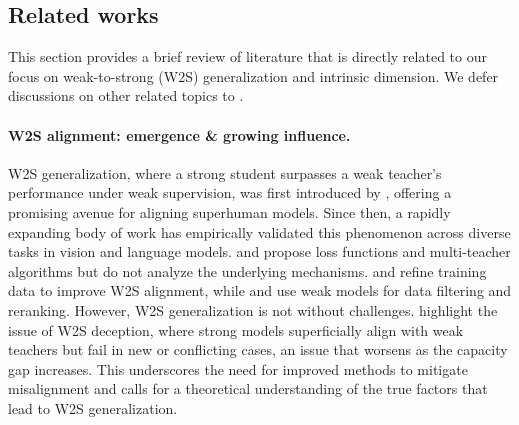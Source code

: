 \subsection{Related works}
This section provides a brief review of literature that is directly related to our focus on weak-to-strong (W2S) generalization and intrinsic dimension. We defer discussions on other related topics to .

\paragraph{W2S alignment: emergence \& growing influence.}
W2S generalization, where a strong student surpasses a weak teacher's performance under weak supervision, was first introduced by \cite{burns2023weak}, offering a promising avenue for aligning superhuman models. Since then, a rapidly expanding body of work has empirically validated this phenomenon across diverse tasks in vision and language models. \citet{guo2024visionsuperalignmentweaktostronggeneralization} and \citet{liu2024cosupervisedlearningimprovingweaktostrong} propose loss functions and multi-teacher algorithms but do not analyze the underlying mechanisms. \citet{guo2024improvingweaktostronggeneralizationreliabilityaware} and \citet{yang2024weaktostrongreasoning} refine training data to improve W2S alignment, while \citet{li2024superfilteringweaktostrongdatafiltering} and \citet{sun2024easytohardgeneralizationscalablealignment} use weak models for data filtering and reranking.
However, W2S generalization is not without challenges. \citet{yang2024superficialalignmentstrongmodelsdeceive} highlight the issue of W2S deception, where strong models superficially align with weak teachers but fail in new or conflicting cases, an issue that worsens as the capacity gap increases. This underscores the need for improved methods to mitigate misalignment and calls for a theoretical understanding of the true factors that lead to W2S generalization.

